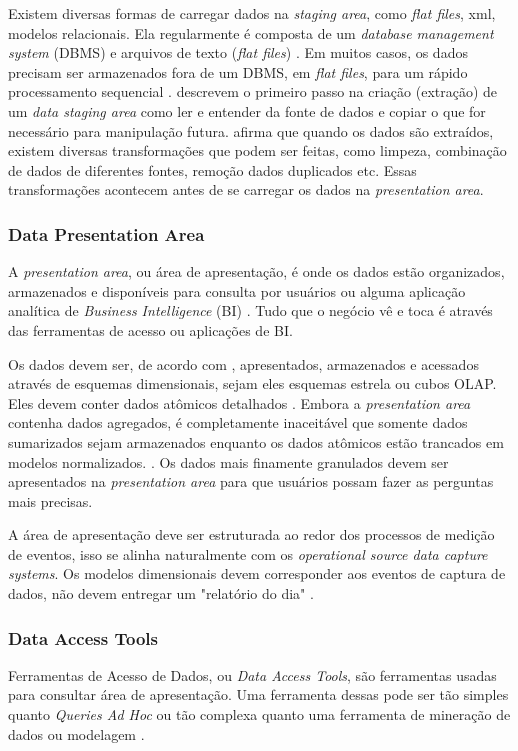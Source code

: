 Existem diversas formas de carregar dados na \textit{staging area}, como \textit{flat files}, xml, modelos relacionais. Ela regularmente é composta de um \textit{database management system} (DBMS) e arquivos de texto (\textit{flat files}) \citep{kimball2004}. Em muitos casos, os dados precisam ser armazenados fora de um DBMS, em \textit{flat files}, para um rápido processamento sequencial \citep{kimball2004}.
 descrevem o primeiro passo na criação (extração) de um \textit{data staging area} como ler e entender da fonte de dados e copiar o que for necessário para manipulação futura.  afirma que quando os dados são extraídos, existem diversas transformações que podem ser feitas, como limpeza, combinação de dados de diferentes fontes, remoção dados duplicados etc. Essas transformações acontecem antes de se carregar os dados na \textit{presentation area}.

\subsubsection{Data Presentation Area}
A \textit{presentation area}, ou área de apresentação, é onde os dados estão organizados, armazenados e disponíveis para consulta por usuários ou alguma aplicação analítica de \textit{Business Intelligence} (BI) \citep{kimball2013}. Tudo que o negócio vê e toca é através das ferramentas de acesso ou aplicações de BI.

Os dados devem ser, de acordo com , apresentados, armazenados e acessados através de esquemas dimensionais, sejam eles esquemas estrela ou cubos OLAP. Eles devem conter dados atômicos detalhados \citep{kimball2013}.  Embora a \textit{presentation area} contenha dados agregados, é completamente inaceitável que somente dados sumarizados sejam armazenados enquanto os dados atômicos estão trancados em modelos normalizados. \citep{kimball2013}. Os dados mais finamente granulados devem ser apresentados na \textit{presentation area} para que usuários possam fazer as perguntas mais precisas.

A área de apresentação deve ser estruturada ao redor dos processos de medição de eventos, isso se alinha naturalmente com os \textit{operational source data capture systems}. Os modelos dimensionais devem corresponder aos eventos de captura de dados, não devem entregar um "relatório do dia" \citep{jmj}. 

\subsubsection{Data Access Tools} Ferramentas de Acesso de Dados, ou \textit{Data Access Tools}, são ferramentas usadas para consultar área de apresentação. Uma ferramenta dessas pode ser tão simples quanto \textit{Queries Ad Hoc} ou tão complexa quanto uma ferramenta de mineração de dados ou modelagem \citep{kimball2013}. 

